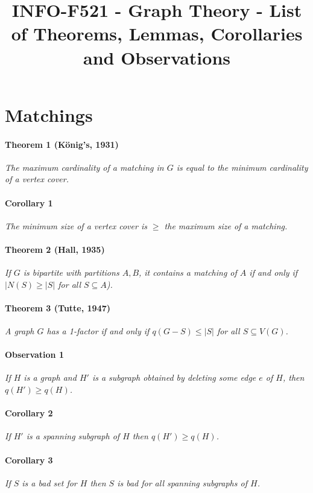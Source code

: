 \documentclass[a4paper,10pt]{article}
\title{INFO-F521 - Graph Theory - List of Theorems, Lemmas, Corollaries and Observations}
\date{\vspace{-7ex}}
\begin{document}
\maketitle

\section{Matchings}
\paragraph{Theorem 1 (König's, 1931)} 
\textit{The maximum cardinality of a matching in $G$ is equal to the minimum cardinality of a vertex cover.}

\paragraph{Corollary 1} \textit{The minimum size of a vertex cover is $\geq$ the maximum size of a matching.}

\paragraph{Theorem 2 (Hall, 1935)} 
\textit{If $G$ is bipartite with partitions $A,B$, it contains a matching of $A$ if and only if $|N(S) \geq |S|$ for all $S \subseteq A$).}

\paragraph{Theorem 3 (Tutte, 1947)} 
		\textit{A graph $G$ has a 1-factor if and only if $q(G - S) \leq |S|$ for all $S \subseteq V(G)$.}

\paragraph{Observation 1} \textit{If $H$ is a graph and $H'$ is a subgraph obtained by deleting some edge $e$ of $H$, then $q(H') \geq q(H)$.}
\paragraph{Corollary 2} \textit{If $H'$ is a spanning subgraph of $H$ then  $q(H') \geq q(H)$.}
		
\paragraph{Corollary 3} \textit{If $S$ is a bad set for $H$ then $S$ is bad for all spanning subgraphs of $H$.}
\end{document}

